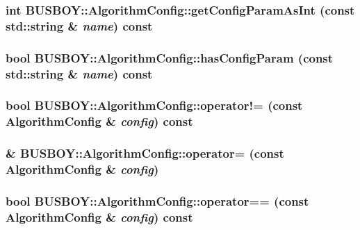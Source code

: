 \label{classBUSBOY_1_1AlgorithmConfig_a1be9c77dd8275d1bb7b16a2f2551ff1d}
\hypertarget{classBUSBOY_1_1AlgorithmConfig_a2d53008dfc68eb401f4cebf9683d4e51}{
\subsubsection[{getConfigParamAsInt}]{\setlength{\rightskip}{0pt plus 5cm}int BUSBOY::AlgorithmConfig::getConfigParamAsInt (const std::string \& {\em name}) const}}
\label{classBUSBOY_1_1AlgorithmConfig_a2d53008dfc68eb401f4cebf9683d4e51}
\hypertarget{classBUSBOY_1_1AlgorithmConfig_a23879b0eff00f20bd949d4c673afb6ad}{
\subsubsection[{hasConfigParam}]{\setlength{\rightskip}{0pt plus 5cm}bool BUSBOY::AlgorithmConfig::hasConfigParam (const std::string \& {\em name}) const}}
\label{classBUSBOY_1_1AlgorithmConfig_a23879b0eff00f20bd949d4c673afb6ad}
\hypertarget{classBUSBOY_1_1AlgorithmConfig_a8c537a1b7a0885932b52e962343e91de}{
\subsubsection[{operator!=}]{\setlength{\rightskip}{0pt plus 5cm}bool BUSBOY::AlgorithmConfig::operator!= (const {\bf AlgorithmConfig} \& {\em config}) const}}
\label{classBUSBOY_1_1AlgorithmConfig_a8c537a1b7a0885932b52e962343e91de}
\hypertarget{classBUSBOY_1_1AlgorithmConfig_a31e47fcab6cce0c194bb5615de5e770d}{
\subsubsection[{operator=}]{ \& BUSBOY::AlgorithmConfig::operator= (const {\bf AlgorithmConfig} \& {\em config})}}
\label{classBUSBOY_1_1AlgorithmConfig_a31e47fcab6cce0c194bb5615de5e770d}
\hypertarget{classBUSBOY_1_1AlgorithmConfig_af12aaef7786f1411b3234c6c3cbc5dee}{
\subsubsection[{operator==}]{\setlength{\rightskip}{0pt plus 5cm}bool BUSBOY::AlgorithmConfig::operator== (const {\bf AlgorithmConfig} \& {\em config}) const}}
\label{classBUSBOY_1_1AlgorithmConfig_af12aaef7786f1411b3234c6c3cbc5dee}


